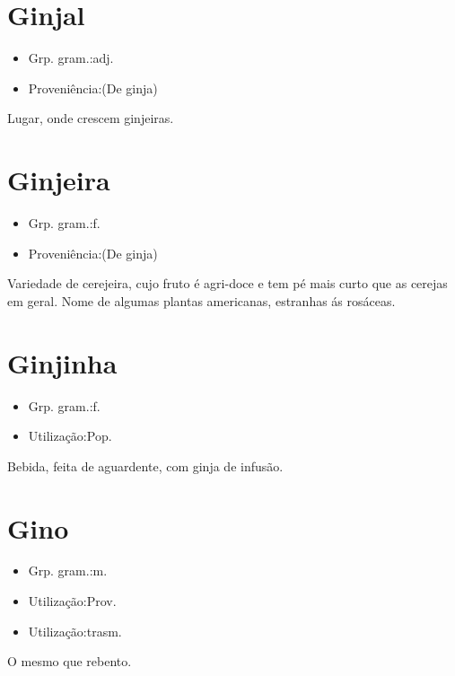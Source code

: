 \section{Ginjal}
\begin{itemize}
\item {Grp. gram.:adj.}
\end{itemize}
\begin{itemize}
\item {Proveniência:(De \textunderscore ginja\textunderscore )}
\end{itemize}
Lugar, onde crescem ginjeiras.
\section{Ginjeira}
\begin{itemize}
\item {Grp. gram.:f.}
\end{itemize}
\begin{itemize}
\item {Proveniência:(De \textunderscore ginja\textunderscore )}
\end{itemize}
Variedade de cerejeira, cujo fruto é agri-doce e tem pé mais curto que as cerejas em geral.
Nome de algumas plantas americanas, estranhas ás rosáceas.
\section{Ginjinha}
\begin{itemize}
\item {Grp. gram.:f.}
\end{itemize}
\begin{itemize}
\item {Utilização:Pop.}
\end{itemize}
Bebida, feita de aguardente, com ginja de infusão.
\section{Gino}
\begin{itemize}
\item {Grp. gram.:m.}
\end{itemize}
\begin{itemize}
\item {Utilização:Prov.}
\end{itemize}
\begin{itemize}
\item {Utilização:trasm.}
\end{itemize}
O mesmo que \textunderscore rebento\textunderscore .
